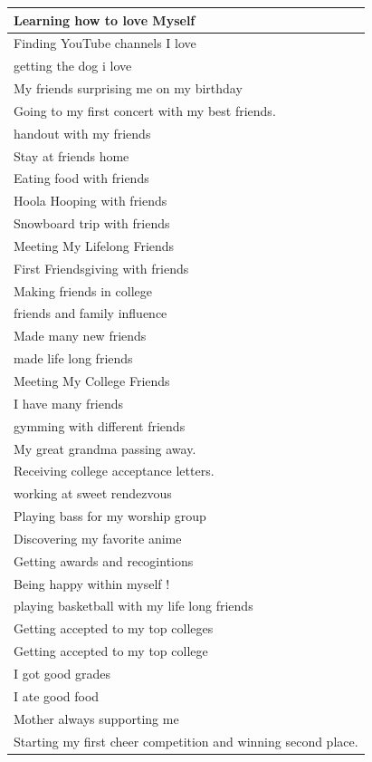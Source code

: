 \documentclass[
  .7em,
  letterpaper,
  DIV=11,
  numbers=noendperiod]{scrartcl}
\begin{document}
\begin{table}
\begin{tabular}{l}
\hline
Learning how to love Myself\\
\hline
Finding YouTube channels I love\\
\hline
getting the dog i love\\
\hline
My friends surprising me on my birthday\\
\hline
Going to my first concert with my best friends.\\
\hline
handout with my friends\\
\hline
Stay at friends home\\
\hline
Eating food with friends\\
\hline
Hoola Hooping with friends\\
\hline
Snowboard trip with friends\\
\hline
Meeting My Lifelong Friends\\
\hline
First Friendsgiving with friends\\
\hline
Making friends in college\\
\hline
friends and family influence\\
\hline
Made many new friends\\
\hline
made life long friends\\
\hline
Meeting My College Friends\\
\hline
I have many friends\\
\hline
gymming with different friends\\
\hline
My great grandma passing away.\\
\hline
Receiving college acceptance letters.\\
\hline
working at sweet rendezvous\\
\hline
Playing bass for my worship group\\
\hline
Discovering my favorite anime\\
\hline
Getting awards and recogintions\\
\hline
Being happy within myself !\\
\hline
playing basketball with my life long friends\\
\hline
Getting accepted to my top colleges\\
\hline
Getting accepted to my top college\\
\hline
I got good grades\\
\hline
I ate good food\\
\hline
Mother always supporting me\\
\hline
Starting my first cheer competition and winning second place.\\

\end{tabular}
\end{table}
\end{document}
